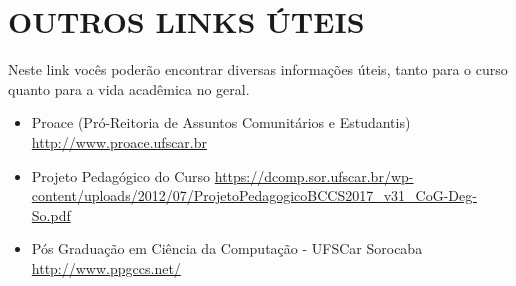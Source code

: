 \section{OUTROS LINKS ÚTEIS}
Neste link vocês poderão encontrar diversas informações úteis, tanto para o curso quanto para a vida acadêmica no geral.

\begin{itemize}

\item Proace (Pró-Reitoria de Assuntos Comunitários e Estudantis) \newline \url{http://www.proace.ufscar.br}


\item Projeto Pedagógico do Curso \newline \url{https://dcomp.sor.ufscar.br/wp-content/uploads/2012/07/Projeto}\newline \url{PedagogicoBCCS2017_v31_CoG-Deg-So.pdf}

\item Pós Graduação em Ciência da Computação - UFSCar Sorocaba \newline \url{http://www.ppgccs.net/}
\end{itemize}
